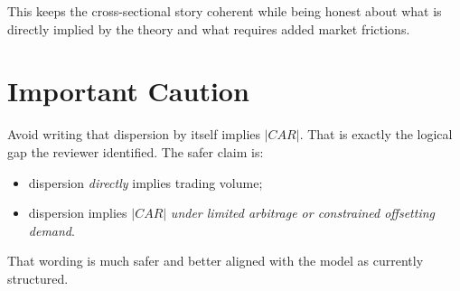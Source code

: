 \documentclass[11pt]{article}
\begin{document}
This keeps the cross-sectional story coherent while being honest about what is directly implied by the theory and what requires added market frictions.

\section*{Important Caution}
Avoid writing that dispersion by itself implies $|CAR|$. That is exactly the logical gap the reviewer identified. The safer claim is:
\begin{itemize}[leftmargin=1.5em]
    \item dispersion \emph{directly} implies trading volume;
    \item dispersion implies $|CAR|$ \emph{under limited arbitrage or constrained offsetting demand}.
\end{itemize}

That wording is much safer and better aligned with the model as currently structured.
\end{document}
